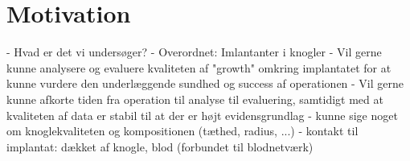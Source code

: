 %
%               
%

\newpage

\section*{Motivation}

 - Hvad er det vi undersøger?
    - Overordnet: Imlantanter i knogler
       - Vil gerne kunne analysere og evaluere kvaliteten af "growth" omkring implantatet
         for at kunne vurdere den underlæggende sundhed og success af operationen
       - Vil gerne kunne afkorte tiden fra operation til analyse til evaluering, samtidigt
         med at kvaliteten af data er stabil til at der er højt evidensgrundlag
       - kunne sige noget om knoglekvaliteten og kompositionen (tæthed, radius, ...)
       - kontakt til implantat: dækket af knogle, blod (forbundet til blodnetværk)
         
